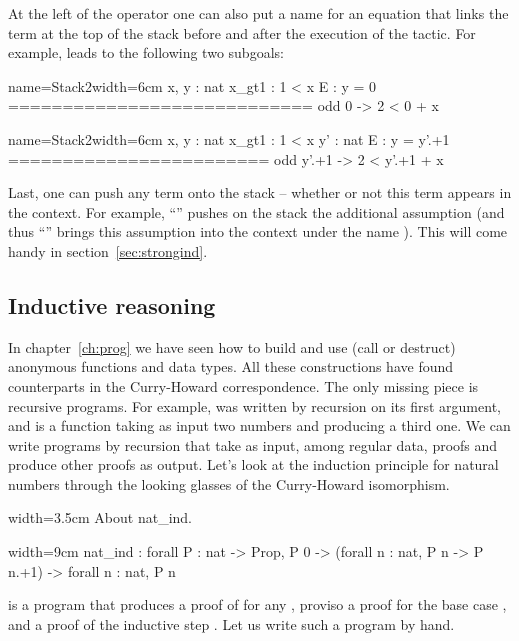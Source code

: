At the left of the \C{:} operator one can also put a name for an
equation that links the term at the top of the stack before and
after the execution of the tactic. For example,
  leads to
the following two subgoals:

\begin{coqout}{name=Stack2}{width=6cm}
 x, y : nat
 x_gt1 : 1 < x
 E : y = 0
============================
 odd 0 -> 2 < 0 + x
\end{coqout}
\begin{coqout}{name=Stack2}{width=6cm}
 x, y : nat
 x_gt1 : 1 < x
 y' : nat
 E : y = y'.+1
========================
 odd y'.+1 -> 2 < y'.+1 + x
\end{coqout}

Last, one can push any term onto the stack -- whether or not this
term appears in the context. For example,
``'' pushes on the stack
the additional assumption  (and thus
``'' brings this assumption into the context
under the name ). This
will come handy in section~\ref{sec:strongind}.

\subsection{Inductive reasoning}\label{ssec:indreason}

In chapter~\ref{ch:prog} we have seen how to build and use (call or destruct)
anonymous functions and data types.  All these
constructions have found counterparts in the Curry-Howard correspondence.
The only missing piece is recursive programs.  For example,
 was written by recursion on its first argument, and is a
function taking as input two numbers and producing a third one.
We can write programs by recursion that take as input, among regular  data,
proofs and produce  other proofs as output.  Let's look at the
induction principle for natural numbers through the looking glasses of the
Curry-Howard isomorphism.

\begin{coq}{}{width=3.5cm}
About nat_ind.
\end{coq}
\begin{coqout}{}{width=9cm}
nat_ind : forall P : nat -> Prop,
  P 0 -> (forall n : nat, P n -> P n.+1) -> forall n : nat, P n
\end{coqout}
 is a program that produces a proof of  for any ,
proviso a proof for the base case , and a proof
of the inductive step .
Let us write such a program by hand.

